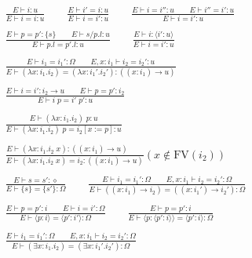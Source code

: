 \documentclass[twoside]{article}
\newcommand{\void}[1]{}
\newcommand{\f}[1]{\mbox{#1}}
\begin{document}
\begin{displaymath}
\begin{array}{c}
\displaystyle
\frac{
E \vdash i : u
}{
E \vdash i = i : u
}
\qquad
\frac{
E \vdash i' = i : u
}{
E \vdash i = i' : u
}
\qquad
\frac{
E \vdash i = i'' : u
\qquad
E \vdash i'' = i' : u
}{
E \vdash i = i' : u
}
\\\\\displaystyle
\frac{
E \vdash p = p' : \{s\}
\qquad
E \vdash s/p.l : u
}{
E \vdash p.l = p'.l : u
}
\qquad
\frac{
E \vdash i : \langle i':u\rangle
}{
E \vdash i = i' : u
}
\\\\\displaystyle
\frac{
E \vdash i_1 = i_1' : \Omega
\qquad
E,x:i_1 \vdash i_2 = i_2' : u
}{
E \vdash (\lambda x:i_1.i_2) = (\lambda x:i_1'.i_2') : ((x:i_1)\to u)
}
\\\\\displaystyle
\frac{
E \vdash i = i' : i_2\to u
\qquad
E \vdash p = p' : i_2
}{
E \vdash i\;p = i'\;p' : u
}
\\\\\displaystyle
\frac{
E \vdash (\lambda x:i_1.i_2)\;p : u
}{
E \vdash (\lambda x:i_1.i_2)\;p = i_2[x:=p] : u
}
\\\\\displaystyle
\frac{
E \vdash (\lambda x:i_1.i_2\;x) : ((x:i_1)\to u)
\qquad
}{
E \vdash (\lambda x:i_1.i_2\;x) = i_2 : ((x:i_1)\to u)
}(x \notin \f{FV}(i_2))
\\\\\displaystyle
\frac{
E \vdash s = s' : \diamond
}{
E \vdash \{s\} = \{s'\} : \Omega
}
\qquad
\frac{
E \vdash i_1 = i_1' : \Omega
\qquad
E,x:i_1 \vdash i_2 = i_2' : \Omega
}{
E \vdash ((x:i_1)\to i_2) = ((x:i_1')\to i_2') : \Omega
}
\\\\\displaystyle
\frac{
E \vdash p = p' : i
\qquad
E \vdash i = i' : \Omega
}{
E \vdash \langle p:i\rangle = \langle p':i'\rangle : \Omega
}
\qquad
\frac{
E \vdash p = p' : i
}{
E \vdash \langle p:\langle p':i\rangle\rangle = \langle p':i\rangle : \Omega
}
\\\\\displaystyle
\frac{
E \vdash i_1 = i_1' : \Omega
\qquad
E,x:i_1 \vdash i_2 = i_2' : \Omega
}{
E \vdash (\exists x:i_1.i_2) = (\exists x:i_1'.i_2') : \Omega
}
\void{
\qquad
\frac{
E \vdash (\exists x:i_1.i_2) : \Omega
}{
E \vdash (\exists x:i_1.i_2) = i_2 : \Omega
}(x \notin \f{FV}(i_2))
}
\end{array}
\end{displaymath}
\end{document}
